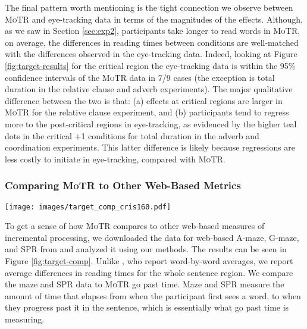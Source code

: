 \documentclass[12pt]{article}
\newcommand{\motr}{\textsc{MoTR}\xspace}
\begin{document}
{The final pattern worth mentioning is the tight connection we observe between \motr and eye-tracking data in terms of the magnitudes of the effects. Although, as we saw in Section \ref{sec:exp2}, participants take longer to read words in \motr, on average, the differences in reading times between conditions are well-matched with the differences observed in the eye-tracking data. Indeed, looking at Figure \ref{fig:target-results} for the critical region the eye-tracking data is within the 95\% confidence intervals of the \motr data in 7/9 cases (the exception is total duration in the relative clause and adverb experiments). The major qualitative difference between the two is that: (a) effects at critical regions are larger in \motr for the relative clause experiment, and (b) participants tend to regress more to the post-critical regions in eye-tracking, as evidenced by the higher teal dots in the critical +1 conditions for total duration in the adverb and coordination experiments. This latter difference is likely because regressions are less costly to initiate in eye-tracking, compared with \motr.

\subsubsection{Comparing \motr to Other Web-Based Metrics}

\begin{figure*}[t]
    \centering
    \begin{minipage}{\textwidth}
    \centering
    \small
    \texttt{[image: images/target\_comp\_cris160.pdf]}
    \vspace{-0.8cm}
    \caption{ \small \textbf{Comparison Between Measures:} Comparison between \motr results (go past time) and data from three online incremental processing measurements reported in \cite{boyce2020amaze}. Errors are 95\% CIs across by-item differences; text indicates 95\% credible intervals for the effect of condition from our regression models, when these do not cross zero.}
    \label{fig:target-comp}
    \end{minipage}
\end{figure*}

To get a sense of how \motr compares to other web-based measures of incremental processing, we downloaded the data for web-based A-maze, G-maze, and SPR from \cite{boyce2020amaze} and analyzed it using our methods. The results can be seen in Figure \ref{fig:target-comp}. Unlike \citet{boyce2020amaze}, who report word-by-word averages, we report average differences in reading times for the whole sentence region. We compare the maze and SPR data to \motr go past time. Maze and SPR measure the amount of time that elapses from when the participant first sees a word, to when they progress past it in the sentence, which is essentially what go past time is measuring.

}
\end{document}
